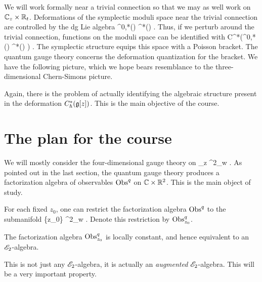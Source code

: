 \documentclass[10pt]{amsart}
\begin{document}
We will work formally near a trivial connection so that we may as well work on $\mathbb C_z \times \mathbb R_t$. 
Deformations of the symplectic moduli space near the trivial connection are controlled by the dg Lie algebra 
\ben
\Omega^{0,*}(\CC) \tensor \Omega^*(\RR) \tensor \fg .
\een 
Thus, if we perturb around the trivial connection, functions on the moduli space can be identified with
\ben
C^*(\Omega^{0,*} (\CC) \tensor \Omega^*(\RR) \tensor \fg) .
\een 
The symplectic structure equips this space with a Poisson bracket. 
The quantum gauge theory concerns the deformation quantization for the bracket. 
We have the following picture, which we hope bears resemblance to the three-dimensional Chern-Simons picture.
\ben
{}
\een

Again, there is the problem of actually identifying the algebraic structure present in the deformation $C_\hbar^*(\mathfrak g[z])$. 
This is the main objective of the course.

\section{The plan for the course}

We will mostly consider the four-dimensional gauge theory on
\ben
\CC_z \times \RR^2_w .
\een
As pointed out in the last section, the quantum gauge theory produces a factorization algebra of observables ${\rm Obs}^q$ on $\mathbb C \times \mathbb R^2$. 
This is the main object of study. 

For each fixed $z_0$, one can restrict the factorization algebra ${\rm Obs}^q$ to the submanifold 
\ben
\{z_0\} \times \RR^2_w .
\een 
Denote this restriction by ${\rm Obs}_{z_0}^q$. 

\begin{lem}
The factorization algebra ${\rm Obs}^q_{z_0}$ is locally constant, and hence equivalent to an $\mathscr E_2$-algebra.
\end{lem}

This is not just any $\mathscr E_2$-algebra, it is actually an {\em augmented} $\mathscr E_2$-algebra.
This will be a very important property.
\end{document}
